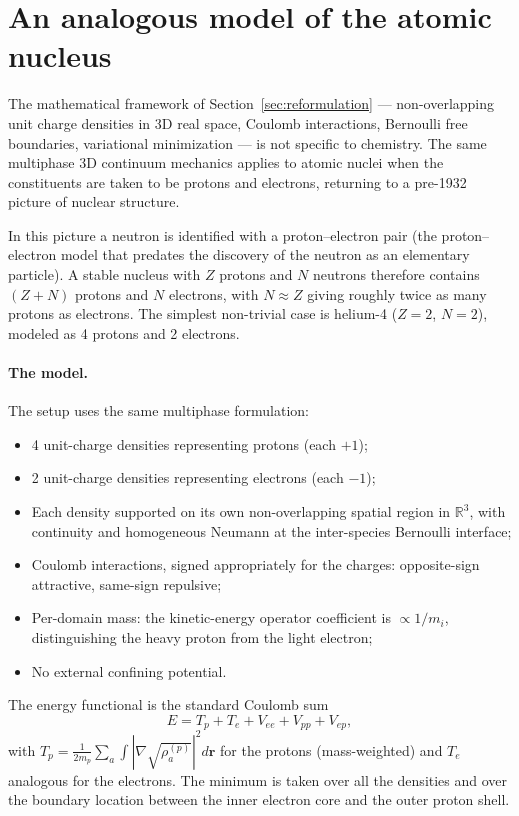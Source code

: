 \documentclass[11pt]{article}
\begin{document}
\section{An analogous model of the atomic nucleus}\label{sec:nucleus}

The mathematical framework of Section~\ref{sec:reformulation} --- non-overlapping unit charge densities in 3D real space, Coulomb interactions, Bernoulli free boundaries, variational minimization --- is not specific to chemistry. The same multiphase 3D continuum mechanics applies to atomic nuclei when the constituents are taken to be protons and electrons, returning to a pre-1932 picture of nuclear structure.

In this picture a neutron is identified with a proton--electron pair (the proton--electron model that predates the discovery of the neutron as an elementary particle). A stable nucleus with $Z$ protons and $N$ neutrons therefore contains $(Z+N)$ protons and $N$ electrons, with $N \approx Z$ giving roughly twice as many protons as electrons. The simplest non-trivial case is helium-4 ($Z=2$, $N=2$), modeled as 4 protons and 2 electrons.

\paragraph{The model.}
The setup uses the same multiphase formulation:
\begin{itemize}
\item 4 unit-charge densities representing protons (each $+1$);
\item 2 unit-charge densities representing electrons (each $-1$);
\item Each density supported on its own non-overlapping spatial region in $\mathbb{R}^3$, with continuity and homogeneous Neumann at the inter-species Bernoulli interface;
\item Coulomb interactions, signed appropriately for the charges: opposite-sign attractive, same-sign repulsive;
\item Per-domain mass: the kinetic-energy operator coefficient is $\propto 1/m_i$, distinguishing the heavy proton from the light electron;
\item No external confining potential.
\end{itemize}

The energy functional is the standard Coulomb sum
\begin{equation}
E = T_p + T_e + V_{ee} + V_{pp} + V_{ep},
\end{equation}
with $T_p = \tfrac{1}{2 m_p} \sum_a \int |\nabla \sqrt{\rho_a^{(p)}}|^2 d\mathbf{r}$ for the protons (mass-weighted) and $T_e$ analogous for the electrons. The minimum is taken over all the densities and over the boundary location between the inner electron core and the outer proton shell.
\end{document}
